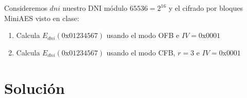 	Consideremos $dni$ nuestro DNI módulo $65536 = 2^{16}$ y el cifrado por bloques MiniAES visto en clase:
	\begin{enumerate}
		\item Calcula $E_{dni}(\mathrm{0x01234567})$ usando el modo OFB e $IV = \mathrm{0x0001}$
		\item Calcula $E_{dni}(\mathrm{0x01234567})$ usando el modo CFB, $r = 3$ e $IV = \mathrm{0x0001}$
	\end{enumerate}
\section*{Solución}
